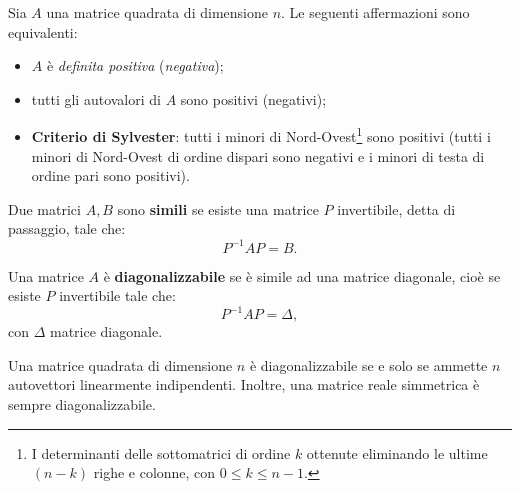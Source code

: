\begin{theorem}
	Sia $A$ una matrice quadrata di dimensione $n$.
  Le seguenti affermazioni sono equivalenti:
	\begin{itemize}
		\item $A$ è \textit{definita positiva} (\textit{negativa});
		\item tutti gli autovalori di $A$ sono positivi (negativi);
		\item \textbf{Criterio di Sylvester}: tutti i minori di Nord-Ovest\footnote{I determinanti delle sottomatrici di ordine $k$ ottenute eliminando le ultime $( n-k)$ righe e colonne, con $0\leqslant k\leqslant n-1$.} sono positivi (tutti i minori di Nord-Ovest di ordine dispari sono negativi e i minori di testa di ordine pari sono positivi).
	\end{itemize}
	\label{thm:matrice-definita-positiva-negativa}
\end{theorem}
\begin{definition}
	Due matrici $A,B$ sono \textbf{simili} se esiste una matrice $P$ invertibile, detta di passaggio, tale che:
	\begin{equation*}
		P^{-1} AP=B.
	\end{equation*}
\end{definition}
\begin{definition}
	Una matrice $A$ è \textbf{diagonalizzabile} se è simile ad una matrice diagonale, cioè se esiste $P$ invertibile tale che:
	\begin{equation*}
		P^{-1} AP=\Delta ,
	\end{equation*}
	con $\Delta $ matrice diagonale.
\end{definition}
\begin{theorem}
	Una matrice quadrata di dimensione $n$ è diagonalizzabile se e solo se ammette $n$ autovettori linearmente indipendenti.
  Inoltre, una matrice reale simmetrica è sempre diagonalizzabile.
\end{theorem}


